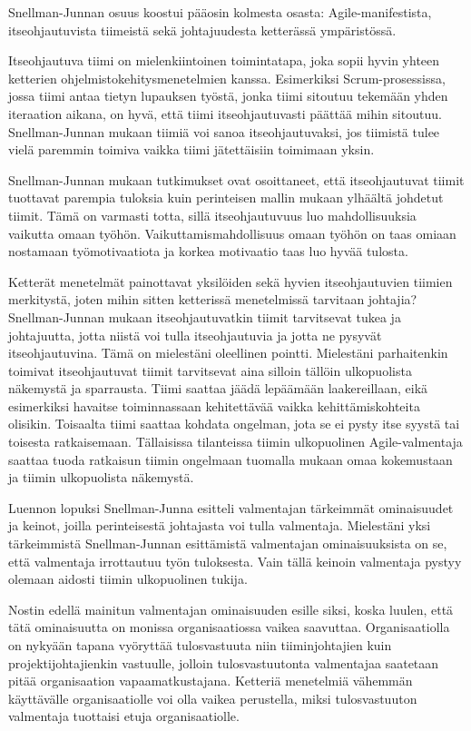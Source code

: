 \documentclass[a4paper]{article}
\begin{document}
Snellman-Junnan osuus koostui pääosin kolmesta osasta: Agile-manifestista, itseohjautuvista tiimeistä sekä johtajuudesta ketterässä ympäristössä.

Itseohjautuva tiimi on mielenkiintoinen toimintatapa, joka sopii hyvin yhteen ketterien ohjelmistokehitysmenetelmien 
kanssa. Esimerkiksi Scrum-prosessissa, jossa tiimi antaa tietyn lupauksen työstä, jonka tiimi sitoutuu tekemään yhden iteraation aikana, on hyvä, että tiimi itseohjautuvasti päättää mihin sitoutuu. Snellman-Junnan mukaan tiimiä voi sanoa itseohjautuvaksi, jos tiimistä tulee vielä paremmin toimiva vaikka tiimi jätettäisiin toimimaan yksin.

Snellman-Junnan mukaan tutkimukset ovat osoittaneet, että itseohjautuvat tiimit tuottavat parempia tuloksia kuin perinteisen mallin mukaan ylhäältä johdetut tiimit. Tämä on varmasti totta, sillä itseohjautuvuus luo mahdollisuuksia vaikutta omaan työhön. Vaikuttamismahdollisuus omaan työhön on taas omiaan nostamaan työmotivaatiota ja korkea motivaatio taas luo hyvää tulosta.

Ketterät menetelmät painottavat yksilöiden sekä hyvien itseohjautuvien tiimien merkitystä, joten mihin sitten ketterissä menetelmissä tarvitaan johtajia? Snellman-Junnan mukaan itseohjautuvatkin tiimit tarvitsevat tukea ja johtajuutta, jotta niistä voi tulla itseohjautuvia ja jotta ne pysyvät itseohjautuvina. Tämä on mielestäni oleellinen pointti. Mielestäni parhaitenkin toimivat itseohjautuvat tiimit tarvitsevat aina silloin tällöin ulkopuolista näkemystä ja sparrausta. Tiimi saattaa jäädä lepäämään laakereillaan, eikä esimerkiksi havaitse toiminnassaan kehitettävää vaikka kehittämiskohteita olisikin. Toisaalta tiimi saattaa kohdata ongelman, jota se ei pysty itse syystä tai toisesta ratkaisemaan. Tällaisissa tilanteissa tiimin ulkopuolinen Agile-valmentaja saattaa tuoda ratkaisun tiimin ongelmaan tuomalla mukaan omaa kokemustaan ja tiimin ulkopuolista näkemystä.

Luennon lopuksi Snellman-Junna esitteli valmentajan tärkeimmät ominaisuudet ja keinot, joilla perinteisestä johtajasta voi tulla valmentaja. Mielestäni yksi tärkeimmistä Snellman-Junnan esittämistä valmentajan ominaisuuksista on se, että valmentaja irrottautuu työn tuloksesta. Vain tällä keinoin valmentaja pystyy olemaan aidosti tiimin ulkopuolinen tukija.

Nostin edellä mainitun valmentajan ominaisuuden esille siksi, koska luulen, että tätä ominaisuutta on monissa organisaatiossa vaikea saavuttaa. Organisaatiolla on nykyään tapana vyöryttää tulosvastuuta niin tiiminjohtajien kuin projektijohtajienkin vastuulle, jolloin tulosvastuutonta valmentajaa saatetaan pitää organisaation vapaamatkustajana. Ketteriä menetelmiä vähemmän käyttävälle organisaatiolle voi olla vaikea perustella, miksi tulosvastuuton valmentaja tuottaisi etuja organisaatiolle.
\end{document}
